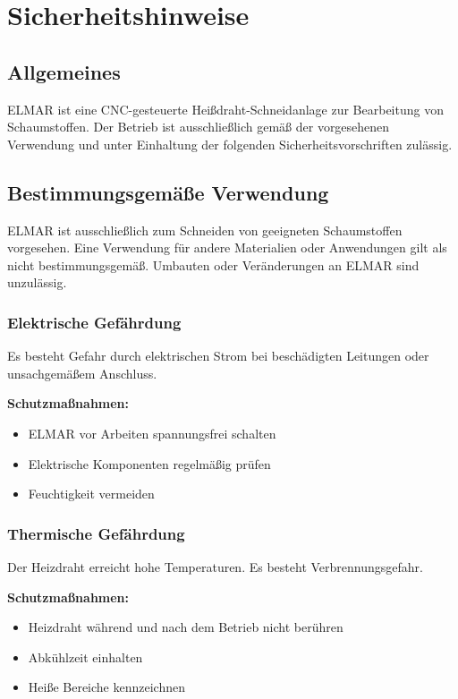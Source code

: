 %
%

\chapter{Sicherheitshinweise}


\section{Allgemeines}
ELMAR ist eine CNC-gesteuerte Heißdraht-Schneidanlage zur Bearbeitung von Schaumstoffen. Der Betrieb ist ausschließlich gemäß der vorgesehenen Verwendung und unter Einhaltung der folgenden Sicherheitsvorschriften zulässig.

\section{Bestimmungsgemäße Verwendung}
ELMAR ist ausschließlich zum Schneiden von geeigneten Schaumstoffen vorgesehen. Eine Verwendung für andere Materialien oder Anwendungen gilt als nicht bestimmungsgemäß. Umbauten oder Veränderungen an ELMAR sind unzulässig.


\subsection{Elektrische Gefährdung}
Es besteht Gefahr durch elektrischen Strom bei beschädigten Leitungen oder unsachgemäßem Anschluss.

\textbf{Schutzmaßnahmen:}
\begin{itemize}
	\item ELMAR vor Arbeiten spannungsfrei schalten
	\item Elektrische Komponenten regelmäßig prüfen
	\item Feuchtigkeit vermeiden
\end{itemize}

\subsection{Thermische Gefährdung}
Der Heizdraht erreicht hohe Temperaturen. Es besteht Verbrennungsgefahr.

\textbf{Schutzmaßnahmen:}
\begin{itemize}
	\item Heizdraht während und nach dem Betrieb nicht berühren
	\item Abkühlzeit einhalten
	\item Heiße Bereiche kennzeichnen
\end{itemize}

